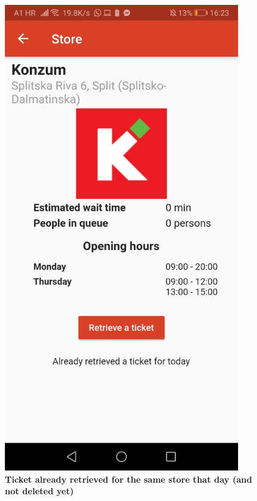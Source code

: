 \begin{figure}[!htb]
\centering
\begin{minipage}{0.45\textwidth}
\centering
\includegraphics[width=0.9\textwidth]{Images/AlreadyRetrieved}
\captionsetup{justification=centering}
\caption{\label{fig:appandroiderr1}\textbf{Ticket already retrieved for the same store that day (and not deleted yet)}}
\end{minipage}
\begin{minipage}{0.45\textwidth}

\end{minipage}
\end{figure}
